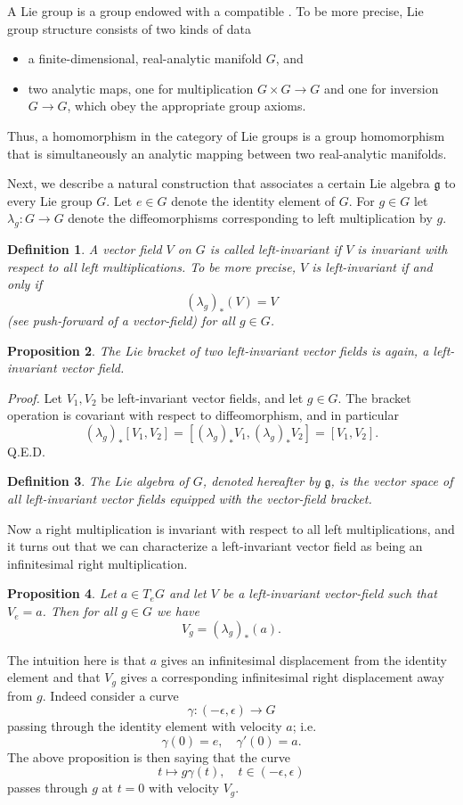 \documentclass{article}
\newcommand{\fg}{\mathfrak{g}}
\newcommand{\lact}{\lambda}
\newtheorem{proposition}{Proposition}
\newtheorem{definition}[proposition]{Definition}
\begin{document}
A Lie group is a group endowed with a compatible .
To be more precise, Lie group structure consists of two kinds of
data
\begin{itemize}
\item a finite-dimensional, real-analytic manifold $G$, and
\item  two analytic maps, one for multiplication $G\times
  G\rightarrow G$ and one for inversion $G\rightarrow G$, which obey
  the appropriate
  group axioms.
\end{itemize}
Thus, a homomorphism in the category of Lie groups is a group
homomorphism that is simultaneously an analytic mapping between two
real-analytic manifolds.

Next, we describe a natural construction that associates a certain
Lie algebra $\fg$ to every Lie group $G$.  Let $e\in G$ denote the
identity element of $G$.
For $g\in G$ let $\lact_g \colon G \to G$ denote the
diffeomorphisms corresponding to left multiplication by $g$.  

\begin{definition}
  A vector field $V$ on $G$ is called left-invariant if $V$ is
  invariant with respect to all left multiplications.  To be more
  precise, $V$ is left-invariant if and only if
  $$(\lact_g)_*(V) = V$$
  (see push-forward of a vector-field) for all
  $g\in G$.   
\end{definition}
\begin{proposition}
  The Lie bracket of two left-invariant vector fields is
  again, a left-invariant vector field.
\end{proposition}
{\em Proof.}
Let $V_1, V_2$ be left-invariant vector fields, and let $g\in G$.
The bracket operation is covariant with respect to diffeomorphism, and
in particular
$$(\lact_g)_*[V_1,V_2] = [(\lact_g)_*V_1,(\lact_g)_*V_2] =
[V_1,V_2].$$
Q.E.D.

\begin{definition}
  The Lie algebra of $G$, denoted hereafter by $\fg$, is the vector space
  of all left-invariant vector fields equipped with the vector-field
  bracket.
\end{definition}

Now a right multiplication is invariant with respect to all
left multiplications, and it turns out that we can characterize a
left-invariant vector field as being an infinitesimal right multiplication.
\begin{proposition}
  Let $a\in T_eG$ and let $V$ be a left-invariant vector-field such that
  $V_e = a$.  Then for all $g\in G$ we have
  $$V_g = (\lact_g)_*(a).$$
\end{proposition}
The intuition here is that $a$
gives an infinitesimal displacement from the identity element and that
$V_g$ gives a corresponding infinitesimal right displacement away from $g$.
Indeed consider a curve 
$$\gamma \colon (-\epsilon,\epsilon) \to G$$
passing through the identity element with velocity $a$; i.e.
$$\gamma(0) = e,\quad \gamma'(0) = a.$$
The above proposition is then
saying that the curve 
$$t\mapsto g\gamma(t),\quad t\in(-\epsilon,\epsilon)$$
passes through
$g$ at $t=0$ with velocity $V_g$.
\end{document}

